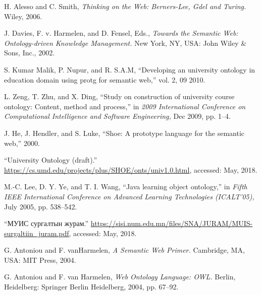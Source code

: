\documentclass[conference, a4paper, mongolian]{myIEEEtran}
\begin{document}
\begin{thebibliography}{00}
 H. Alesso and C. Smith, \textit{Thinking on the Web: Berners-Lee, Gdel and Turing.} Wiley, 2006.

 J. Davies, F. v. Harmelen, and D. Fensel, Eds., \textit{Towards the Semantic Web: Ontology-driven Knowledge Management.} New York, NY, USA: John Wiley \& Sons, Inc., 2002.

 S. Kumar Malik, P. Nupur, and R. S.A.M, “Developing an university ontology in education domain using protg for semantic web,” vol. 2, 09 2010.

 L. Zeng, T. Zhu, and X. Ding, “Study on construction of university course ontology: Content, method and process,” in \textit{2009 International Conference on Computational Intelligence and Software Engineering,} Dec 2009, pp. 1–4.

 J. He, J. Hendler, and S. Luke, “Shoe: A prototype language for the semantic web,” 2000.

 “University Ontology (draft).” \url{https://cs.umd.edu/projects/plus/SHOE/onts/univ1.0.html}, accessed: May, 2018.

 M.-C. Lee, D. Y. Ye, and T. I. Wang, “Java learning object ontology,” in \textit{Fifth IEEE International Conference on Advanced Learning Technologies (ICALT’05),} July 2005, pp. 538–542.

 “МУИС сургалтын журам.” \url{https://sisi.num.edu.mn/files/SNA/JURAM/MUIS-surgaltiin_juram.pdf}, accessed: May, 2018.

 G. Antoniou and F. vanHarmelen, \textit{A Semantic Web Primer.} Cambridge, MA, USA: MIT Press, 2004.

 G. Antoniou and F. van Harmelen, \textit{Web Ontology Language: OWL.} Berlin, Heidelberg: Springer Berlin Heidelberg, 2004, pp. 67–92.

\end{thebibliography}
%
\end{document}

